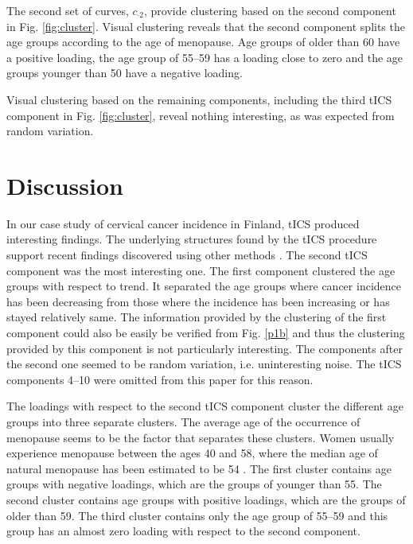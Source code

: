 \documentclass{llncs}
\begin{document}
The second set of curves, $c_{\cdot2}$, provide  clustering based on the second component in Fig. \ref{fig:cluster}. Visual clustering  reveals that the second component splits the age groups according to the age of menopause. Age groups of older than 60 have a positive loading, the age group of 55--59 has a loading close to zero and the age groups younger than 50 have a negative loading. 

Visual clustering based on the remaining components, including the third tICS component in Fig. \ref{fig:cluster}, reveal nothing interesting, as was expected from random variation.










\section{Discussion}\label{disc}

In our case study of cervical cancer incidence in Finland, tICS  produced interesting findings. 
The underlying structures  found by the tICS procedure support recent findings discovered using other methods \cite{JP3}. The second tICS component was the most interesting one. The first component clustered the age groups with respect to trend. It separated the age groups where cancer incidence has been decreasing from those where the incidence  has been increasing or has stayed relatively same. The information provided by the clustering of the first component could also be easily be verified from Fig. \ref{p1b} and thus the clustering provided by this component is not particularly interesting. The components after the second one seemed to be random variation, i.e. uninteresting noise. The tICS components 4--10 were omitted from this paper for this reason.



The loadings with respect to the second tICS component cluster the different age groups into three separate clusters. The average age of the occurrence of menopause seems to be the factor that separates these clusters. Women usually experience menopause between the ages 40 and 58, where the median age of natural menopause has been estimated to be 54 \cite{dratva2009}. The first cluster contains age groups with negative loadings, which are the groups of younger than 55. The second cluster contains age groups with positive loadings, which are the groups of older than 59.  The third cluster contains only the age group of 55--59 and this group has an almost zero loading with respect to the second component.
\end{document}
